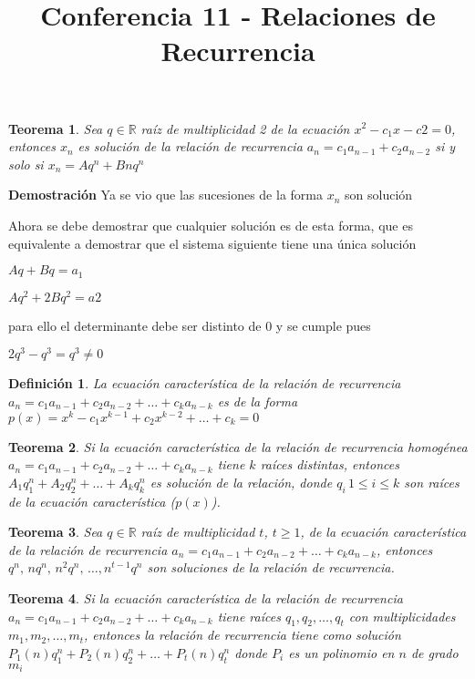 \documentclass[a4paper,12pt]{report}
\title{Conferencia 11 - Relaciones de Recurrencia}
\author{}
\newtheorem*{teo}{Teorema}
\newtheorem*{dfn}{Definición}
\begin{document}
\maketitle





\begin{teo}
 Sea $q\in\mathbb{R}$ raíz de multiplicidad 2 de la ecuación $x^2-c_1x-c2=0$, entonces $x_n$ es solución de la relación de recurrencia $a_n=c_1a_{n-1}+c_2a_{n-2}$ si y solo si $x_n=Aq^n + Bnq^n$ 
\end{teo}

\textbf{Demostración}
Ya se vio que las sucesiones de la forma $x_n$ son solución

Ahora se debe demostrar que cualquier solución es de esta forma, que es equivalente a demostrar que el sistema siguiente tiene una única solución

$Aq+Bq=a_1$

$Aq^2+2Bq^2=a2$

para ello el determinante debe ser distinto de 0 y se cumple pues

$2q^3-q^3=q^3\neq0$

\begin{dfn}
 La ecuación característica de la relación de recurrencia\\ 
 $a_n=c_1a_{n-1}+c_2a_{n-2}+\dots+c_ka_{n-k}$ es de la forma\\ 
 $p(x)=x^k-c_1x^{k-1}+c_2x^{k-2}+\dots+c_k=0$
\end{dfn}

\begin{teo}
 Si la ecuación característica de la relación de recurrencia homogénea $a_n=c_1a_{n-1}+c_2a_{n-2}+\dots+c_ka_{n-k}$ tiene $k$ raíces distintas, entonces 
 $A_1q^n_1+A_2q^n_2+\dots+A_kq^n_k$ es solución de la relación, donde $q_i\, 1\leq i\leq k$ son raíces de la ecuación característica ($p(x)$). 
\end{teo}

\begin{teo}
 Sea $q\in\mathbb{R}$ raíz de multiplicidad $t$, $t\geq1$, de la ecuación característica de la relación de recurrencia $a_n=c_1a_{n-1}+c_2a_{n-2}+\dots+c_ka_{n-k}$, entonces $q^n,\, nq^n,\, n^2q^n,\,\dots,n^{t-1}q^n $ son soluciones de la relación de recurrencia.
\end{teo}

\begin{teo}
 Si la ecuación característica de la relación de recurrencia\\ 
 $a_n=c_1a_{n-1}+c_2a_{n-2}+\dots+c_ka_{n-k}$ tiene raíces $q_1,q_2,\dots,q_t$ con multiplicidades $m_1, m_2,\dots, m_t$, entonces la relación de recurrencia tiene como solución
 $P_1(n)q^n_1+P_2(n)q^n_2+\dots+P_t(n)q^n_t$ donde $P_i$ es un polinomio en $n$ de grado $m_i $
\end{teo}
\end{document}

